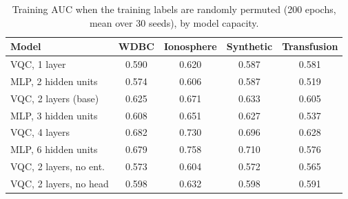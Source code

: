 \begin{table}[t]
\centering
\caption{Training AUC when the training labels are randomly permuted (200 epochs, mean over 30 seeds), by model capacity.}
\label{tab:h3shuffled}
\footnotesize
\setlength{\tabcolsep}{2.5pt}
\begin{tabular}{lcccc}
\hline
Model & WDBC & Ionosphere & Synthetic & Transfusion \\
\hline
VQC, 1 layer & 0.590 & 0.620 & 0.587 & 0.581 \\
MLP, 2 hidden units & 0.574 & 0.606 & 0.587 & 0.519 \\
VQC, 2 layers (base) & 0.625 & 0.671 & 0.633 & 0.605 \\
MLP, 3 hidden units & 0.608 & 0.651 & 0.627 & 0.537 \\
VQC, 4 layers & 0.682 & 0.730 & 0.696 & 0.628 \\
MLP, 6 hidden units & 0.679 & 0.758 & 0.710 & 0.576 \\
VQC, 2 layers, no ent. & 0.573 & 0.604 & 0.572 & 0.565 \\
VQC, 2 layers, no head & 0.598 & 0.632 & 0.598 & 0.591 \\
\hline
\end{tabular}
\end{table}
